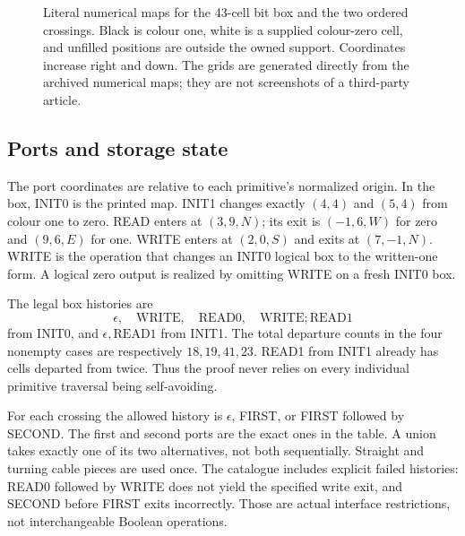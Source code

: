 \documentclass[11pt,letterpaper]{article}
\theoremstyle{definition}\newtheorem{definition}[theorem]{Definition}
\theoremstyle{remark}\newtheorem{remark}[theorem]{Remark}
\begin{document}
\begin{figure}[ht]
\centering
\caption{Literal numerical maps for the 43-cell bit box and the two ordered crossings. Black is colour one, white is a supplied colour-zero cell, and unfilled positions are outside the owned support. Coordinates increase right and down. The grids are generated directly from the archived numerical maps; they are not screenshots of a third-party article.}
\label{ptr:la:fig:primitives}
\end{figure}

\subsection{Ports and storage state}

The port coordinates are relative to each primitive's normalized origin. In the box, INIT0 is the printed map. INIT1 changes exactly $(4,4)$ and $(5,4)$ from colour one to zero. READ enters at $(3,9,N)$; its exit is $(-1,6,W)$ for zero and $(9,6,E)$ for one. WRITE enters at $(2,0,S)$ and exits at $(7,-1,N)$. WRITE is the operation that changes an INIT0 logical box to the written-one form. A logical zero output is realized by omitting WRITE on a fresh INIT0 box.

The legal box histories are
\[
 \epsilon,\quad \mathrm{WRITE},\quad \mathrm{READ0},\quad
 \mathrm{WRITE};\mathrm{READ1}
\]
from INIT0, and $\epsilon,\mathrm{READ1}$ from INIT1. The total departure counts in the four nonempty cases are respectively $18,19,41,23$. READ1 from INIT1 already has cells departed from twice. Thus the proof never relies on every individual primitive traversal being self-avoiding.

For each crossing the allowed history is $\epsilon$, FIRST, or FIRST followed by SECOND. The first and second ports are the exact ones in the table. A union takes exactly one of its two alternatives, not both sequentially. Straight and turning cable pieces are used once. The catalogue includes explicit failed histories: READ0 followed by WRITE does not yield the specified write exit, and SECOND before FIRST exits incorrectly. Those are actual interface restrictions, not interchangeable Boolean operations.
\end{document}
